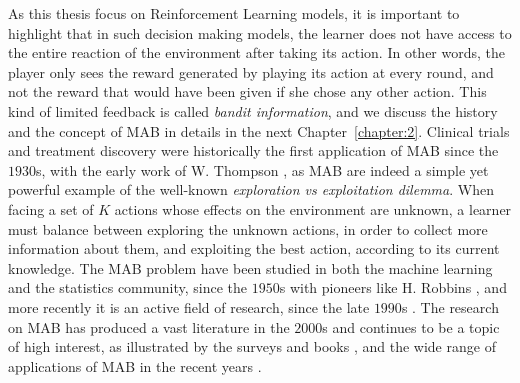 As this thesis focus on Reinforcement Learning models,
it is important to highlight that in such decision making models, the learner does not have access to the entire reaction of the environment after taking its action.
%
In other words, the player only sees the reward generated by playing its action at every round, and not the reward that would have been given if she chose any other action.
This kind of limited feedback is called \emph{bandit information}, and we discuss the history and the concept of MAB in details in the next Chapter~\ref{chapter:2}.
Clinical trials and treatment discovery were historically the first application of MAB since the $1930$s, with the early work of W. Thompson \cite{Thompson33},
%
as MAB are indeed a simple yet powerful example of the well-known \emph{exploration vs exploitation dilemma}.
When facing a set of $K$ actions whose effects on the environment are unknown, a learner must balance between
exploring the unknown actions, in order to collect more information about them,
and exploiting the best action, according to its current knowledge.
%
The MAB problem have been studied in both the machine learning and the statistics community, since the $1950$s with pioneers like H. Robbins \cite{Robbins52}, and more recently it is an active field of research, since the late $1990$s \cite{Anantharam87a,Anantharam87b,auer1995gambling,Agrawal95}.
The research on MAB has produced a vast literature in the $2000$s \cite{Auer02,Auer02NonStochastic,Audibert2009minimax} and continues to be a topic of high interest, as illustrated by the surveys and books \cite{Bubeck12,LattimoreBanditAlgorithmsBook,Slivkins2019}, and the wide range of applications of MAB in the recent years \cite{bouneffouf2019survey}.


